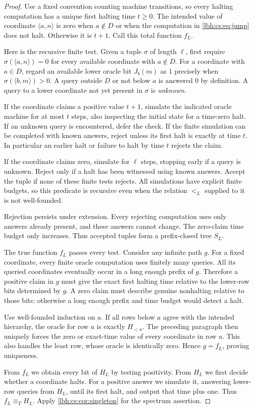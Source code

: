 \documentclass[11pt,letterpaper]{article}
\theoremstyle{definition}
\theoremstyle{remark}
\newcommand{\1}{\mathbf 1}
\begin{document}
\begin{proof}
Use a fixed convention counting machine transitions, so every halting
computation has a unique first halting time $t\geq0$. The intended value
of coordinate $\langle a,n\rangle$ is zero when $a\notin D$ or when the
computation in \eqref{lbh:cs:eq:jump} does not halt. Otherwise it is $t+1$.
Call this total function $f_L$.

Here is the recursive finite test. Given a tuple $\sigma$ of length
$\ell$, first require $\sigma(\langle a,n\rangle)=0$ for every available
coordinate with $a\notin D$. For a coordinate with $a\in D$, regard an
available lower oracle bit $J_b(m)$ as $1$ precisely when
$\sigma(\langle b,m\rangle)>0$. A query outside $D$ or not below $a$ is
answered $0$ by definition. A query to a lower coordinate not yet present
in $\sigma$ is \emph{unknown}.

If the coordinate claims a positive value $t+1$, simulate the indicated
oracle machine for at most $t$ steps, also inspecting the initial state
for a time-zero halt. If an unknown query is encountered, defer the check.
If the finite simulation can be completed with known answers, reject
unless its first halt is exactly at time $t$. In particular an earlier
halt or failure to halt by time $t$ rejects the claim.

If the coordinate claims zero, simulate for $\ell$ steps, stopping early
if a query is unknown. Reject only if a halt has been witnessed using
known answers. Accept the tuple if none of these finite tests rejects.
All simulations have explicit finite budgets, so this predicate is
recursive even when the relation $<_L$ supplied to it is not well-founded.

Rejection persists under extension. Every rejecting computation uses only
answers already present, and these answers cannot change. The zero-claim
time budget only increases. Thus accepted tuples form a prefix-closed
tree $S_L$.

The true function $f_L$ passes every test. Consider any infinite path $g$.
For a fixed coordinate, every finite oracle computation uses finitely many
queries. All its queried coordinates eventually occur in a long enough
prefix of $g$. Therefore a positive claim in $g$ must give the exact first
halting time relative to the lower-row bits determined by $g$. A zero
claim must describe genuine nonhalting relative to those bits: otherwise
a long enough prefix and time budget would detect a halt.

Use well-founded induction on $a$. If all rows below $a$ agree with the
intended hierarchy, the oracle for row $a$ is exactly $H_{<a}$. The preceding
paragraph then uniquely forces the zero or exact-time value of every
coordinate in row $a$. This also handles the least row, whose oracle is
identically zero. Hence $g=f_L$, proving uniqueness.

From $f_L$ we obtain every bit of $H_L$ by testing positivity. From $H_L$
we first decide whether a coordinate halts. For a positive answer we
simulate it, answering lower-row queries from $H_L$, until its first halt,
and output that time plus one. Thus $f_L\equiv_T H_L$. Apply
\cref{lbh:cs:cor:singleton} for the spectrum assertion.
\end{proof}
\end{document}
